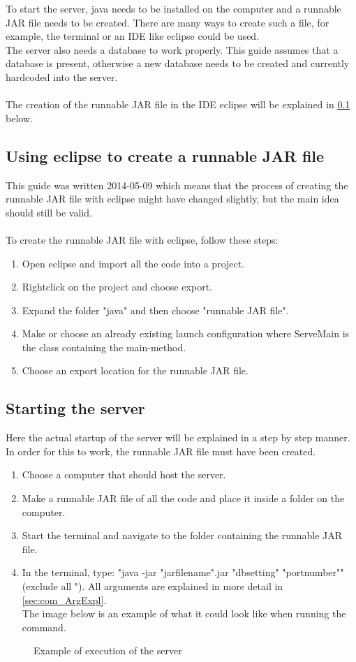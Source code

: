 To start the server, java needs to be installed on the computer and a runnable JAR file needs to be created.
There are many ways to create such a file, for example, the terminal or
an IDE like eclipse could be used. \\The server also needs a database to work properly. This guide assumes that a database is present, otherwise a new database needs to be created and currently hardcoded into the server.\\
\\
The creation of the runnable JAR file in the IDE eclipse will be explained in \ref{sec:com_UsingEclipse} below.
\subsection{Using eclipse to create a runnable JAR file}
\label{sec:com_UsingEclipse}
This guide was written 2014-05-09 which means that the process of creating the runnable JAR file with eclipse might have changed slightly, but the main idea should still be valid.\\
\\
To create the runnable JAR file with eclipse, follow these steps:
\begin{enumerate}
\item Open eclipse and import all the code into a project.
\item Rightclick on the project and choose export.
\item Expand the folder "java" and then choose "runnable JAR file".
\item Make or choose an already existing launch configuration where ServeMain is the class containing the main-method.
\item Choose an export location for the runnable JAR file.
\end{enumerate}

\subsection{Starting the server}
Here the actual startup of the server will be explained in a step by step manner.
In order for this to work, the runnable JAR file must have been created.
\begin{enumerate}
\item Choose a computer that should host the server.
\item Make a runnable JAR file of all the code and place it inside a folder on the computer.
\item Start the terminal and navigate to the folder containing the runnable JAR file.
\item In the terminal, type: "java -jar "jarfilename".jar "dbsetting" "portnumber"" (exclude all "). All arguments are explained in more detail in \ref{sec:com_ArgExpl}.\\ 
The image  below is an example of what it could look like when running the command. 
\end{enumerate}
\begin{figure}[h]
\caption{Example of execution of the server}
\label{fig:com_runserverterminal}
\end{figure}

